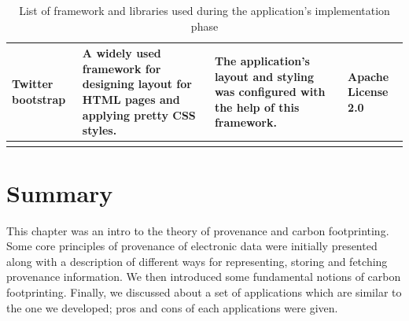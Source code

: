 \begin{longtable}{|p{100px}|p{100px}|p{100px}|p{100px}|}
    Twitter bootstrap  & A widely used framework for designing layout for HTML pages and applying pretty CSS styles. & The application's layout and styling was configured with the help of this framework. & Apache License 2.0 \\
    \hline

  \caption{List of framework and libraries used during the application's implementation phase}\label{implementaioFrameworks}
\end{longtable}



\section{Summary}
This chapter was an intro to the theory of provenance and carbon footprinting. Some core principles of provenance of electronic data were initially presented along with a description of different ways for representing, storing and fetching provenance information. We then introduced some fundamental notions of carbon footprinting. Finally, we discussed about a set of applications which are similar to the one we developed; pros and cons of each applications were given.
